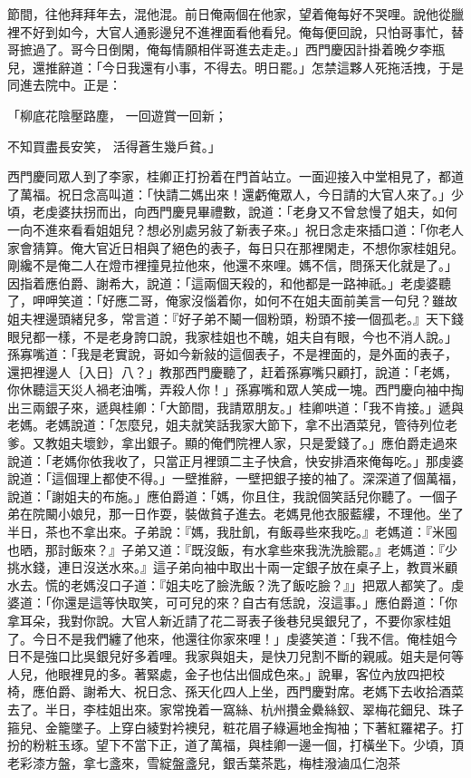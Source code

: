 節間，往他拜拜年去，混他混。前日俺兩個在他家，望着俺每好不哭哩。說他從臘裡不好到如今，大官人通影邊兒不進裡面看他看兒。俺每便回說，只怕哥事忙，替哥摭過了。哥今日倒閑，俺每情願相伴哥進去走走。」西門慶因計掛着晚夕李瓶兒，還推辭道：「今日我還有小事，不得去。明日罷。」怎禁這夥人死拖活拽，于是同進去院中。正是：

「柳底花陰壓路塵，  一回遊賞一回新；

不知買盡長安笑，  活得蒼生幾戶貧。」

西門慶同眾人到了李家，桂卿正打扮着在門首站立。一面迎接入中堂相見了，都道了萬福。祝日念高叫道：「快請二媽出來！還虧俺眾人，今日請的大官人來了。」少頃，老虔婆扶拐而出，向西門慶見畢禮數，說道：「老身又不曾怠慢了姐夫，如何一向不進來看看姐姐兒？想必別處另敍了新表子來。」祝日念走來插口道：「你老人家會猜算。俺大官近日相與了絕色的表子，每日只在那裡閑走，不想你家桂姐兒。剛纔不是俺二人在燈巿裡撞見拉他來，他還不來哩。媽不信，問孫天化就是了。」因指着應伯爵、謝希大，說道：「這兩個天殺的，和他都是一路神祇。」老虔婆聽了，呷呷笑道：「好應二哥，俺家沒惱着你，如何不在姐夫面前美言一句兒？雖故姐夫裡邊頭緒兒多，常言道：『好子弟不鬫一個粉頭，粉頭不接一個孤老。』天下錢眼兒都一樣，不是老身誇口說，我家桂姐也不醜，姐夫自有眼，今也不消人說。」孫寡嘴道：「我是老實說，哥如今新敍的這個表子，不是裡面的，是外面的表子，還把裡邊人｛入日｝八？」教那西門慶聽了，赶着孫寡嘴只顧打，說道：「老媽，你休聽這天災人禍老油嘴，弄殺人你！」孫寡嘴和眾人笑成一塊。西門慶向袖中掏出三兩銀子來，遞與桂卿：「大節間，我請眾朋友。」桂卿哄道：「我不肯接。」遞與老媽。老媽說道：「怎麼兒，姐夫就笑話我家大節下，拿不出酒菜兒，管待列位老爹。又教姐夫壞鈔，拿出銀子。顯的俺們院裡人家，只是愛錢了。」應伯爵走過來說道：「老媽你依我收了，只當正月裡頭二主子快倉，快安排酒來俺每吃。」那虔婆說道：「這個理上都使不得。」一壁推辭，一壁把銀子接的袖了。深深道了個萬福，說道：「謝姐夫的布施。」應伯爵道：「媽，你且住，我說個笑話兒你聽了。一個子弟在院闞小娘兒，那一日作耍，裝做貧子進去。老媽見他衣服藍縷，不理他。坐了半日，茶也不拿出來。子弟說：『媽，我肚飢，有飯尋些來我吃。』老媽道：『米囤也晒，那討飯來？』子弟又道：『既沒飯，有水拿些來我洗洗臉罷。』老媽道：『少挑水錢，連日沒送水來。』這子弟向袖中取出十兩一定銀子放在桌子上，教買米顧水去。慌的老媽沒口子道：『姐夫吃了臉洗飯？洗了飯吃臉？』」把眾人都笑了。虔婆道：「你還是這等快取笑，可可兒的來？自古有恁說，沒這事。」應伯爵道：「你拿耳朵，我對你說。大官人新近請了花二哥表子後巷兒吳銀兒了，不要你家桂姐了。今日不是我們纏了他來，他還往你家來哩！」虔婆笑道：「我不信。俺桂姐今日不是強口比吳銀兒好多着哩。我家與姐夫，是快刀兒割不斷的親戚。姐夫是何等人兒，他眼裡見的多。著緊處，金子也估出個成色來。」說畢，客位內放四把校椅，應伯爵、謝希大、祝日念、孫天化四人上坐，西門慶對席。老媽下去收拾酒菜去了。半日，李桂姐出來。家常挽着一窩絲、杭州攢金纍絲釵、翠梅花鈿兒、珠子箍兒、金籠墜子。上穿白綾對衿襖兒，粧花眉子綠遍地金掏袖；下著紅羅裙子。打扮的粉粧玉琢。望下不當下正，道了萬福，與桂卿一邊一個，打橫坐下。少頃，頂老彩漆方盤，拿七盞來，雪綻盤盞兒，銀舌葉茶匙，梅桂潑滷瓜仁泡茶 